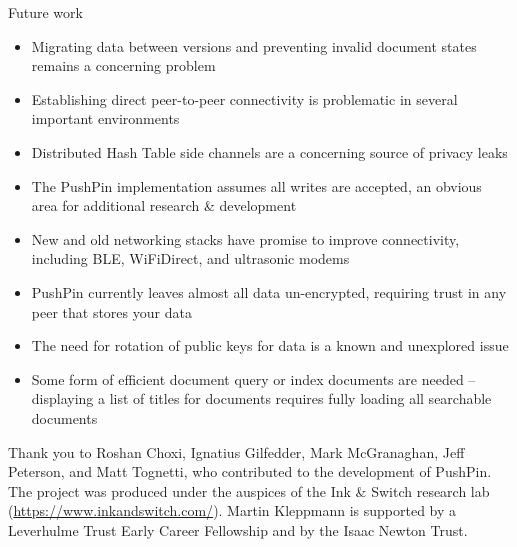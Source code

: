 \documentclass[sigplan,10pt]{acmart}
\begin{document}
Future work
\begin{itemize}
    \item Migrating data between versions and preventing invalid document states remains a concerning problem
    \item Establishing direct peer-to-peer connectivity is problematic in several important environments
    \item Distributed Hash Table side channels are a concerning source of privacy leaks
    \item The PushPin implementation assumes all writes are accepted, an obvious area for additional research \& development
    \item New and old networking stacks have promise to improve connectivity, including BLE, WiFiDirect, and ultrasonic modems
    \item PushPin currently leaves almost all data un-encrypted, requiring trust in any peer that stores your data
    \item The need for rotation of public keys for data is a known and unexplored issue
    \item Some form of efficient document query or index documents are needed -- displaying a list of titles for documents requires fully loading all searchable documents
\end{itemize}

\begin{acks}
Thank you to Roshan Choxi, Ignatius Gilfedder, Mark McGranaghan, Jeff Peterson, and Matt Tognetti, who contributed to the development of PushPin.
The project was produced under the auspices of the Ink \& Switch research lab (\url{https://www.inkandswitch.com/}).
Martin Kleppmann is supported by a Leverhulme Trust Early Career Fellowship and by the Isaac Newton Trust.
\end{acks}


{}
\end{document}
